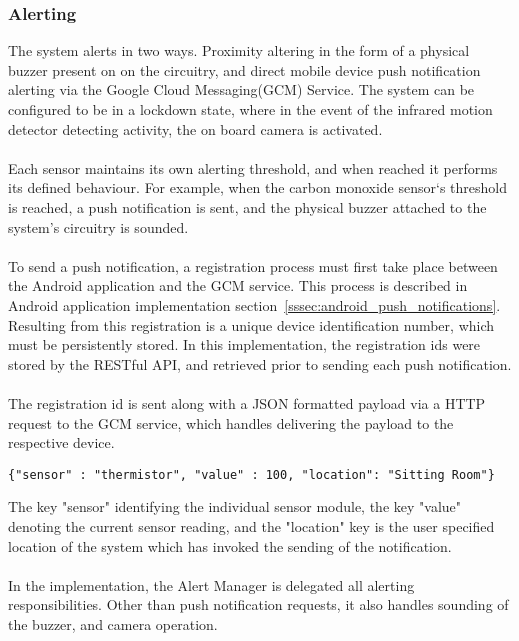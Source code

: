 \documentclass{article}
\begin{document}
\subsubsection{Alerting}
The system alerts in two ways. Proximity altering in the form of a physical buzzer present on on the circuitry, and direct mobile device push notification alerting via the Google Cloud Messaging(GCM) Service. The system can be configured to be in a lockdown state, where in the event of the infrared motion detector detecting activity, the on board camera is activated. \\\\
Each sensor maintains its own alerting threshold, and when reached it performs its defined behaviour. For example, when the carbon monoxide sensor\lq s threshold is reached, a push notification is sent, and the physical buzzer attached to the system’s circuitry is sounded. \\\\
To send a push notification, a registration process must first take place between the Android application and the GCM service. This process is described in Android application implementation section~\ref{sssec:android_push_notifications}. Resulting from this registration is a unique device identification number, which must be persistently stored. In this implementation, the registration ids were stored by the RESTful API, and retrieved prior to sending each push notification. \\\\
The registration id is sent along with a JSON formatted payload via a HTTP request to the GCM service, which handles delivering the payload to the respective device. 
\begin{center}
\begin{lstlisting}[caption={JSON Push Notification Payload Example},label={lst:sms_pn}]
{"sensor" : "thermistor", "value" : 100, "location": "Sitting Room"}
\end{lstlisting}
\end{center}
The key "sensor" identifying the individual sensor module, the key "value" denoting the current sensor reading, and the "location" key is the user specified location of the system which has invoked the sending of the notification. \\\\
In the implementation, the Alert Manager is delegated all alerting responsibilities. Other than push notification requests, it also handles sounding of the buzzer, and camera operation. 
\end{document}
